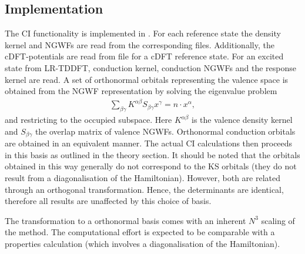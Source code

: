 \documentclass[letterpaper,10pt,english]{sphinxmanual}
\begin{document}
\subsection{Implementation}
\label{\detokenize{ci:implementation}}
The CI functionality is implemented in . For each
reference state the density kernel and NGWFs are read from the
corresponding files. Additionally, the cDFT-potentials are read from
file for a cDFT reference state. For an excited state from LR-TDDFT,
conduction kernel, conduction NGWFs and the response kernel are read. A
set of orthonormal orbitals representing the valence space is obtained
from the NGWF representation by solving the eigenvalue problem
\begin{equation*}
\begin{split}\sum_{\beta\gamma}K^{\alpha\beta}S_{\beta\gamma}x^{\gamma}=n\cdot x^{\alpha},\end{split}
\end{equation*}
and restricting to the occupied subspace. Here \(K^{\alpha\beta}\)
is the valence density kernel and \(S_{\beta\gamma}\) the overlap
matrix of valence NGWFs. Orthonormal conduction orbitals are obtained in
an equivalent manner. The actual CI calculations then proceeds in this
basis as outlined in the theory section. It should be noted that the
orbitals obtained in this way generally do not correspond to the KS
orbitals (they do not result from a diagonalisation of the Hamiltonian).
However, both are related through an orthogonal transformation. Hence,
the determinants are identical, therefore all results are unaffected by
this choice of basis.

The transformation to a orthonormal basis comes with an inherent
\(N^{3}\) scaling of the method. The computational effort is
expected to be comparable with a properties calculation (which involves
a diagonalisation of the Hamiltonian).
\end{document}
